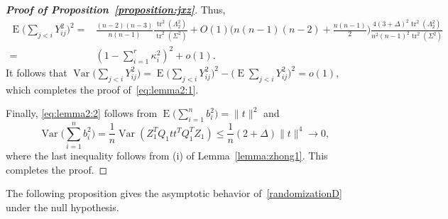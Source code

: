 \documentclass[3p]{elsarticle}
\DeclareMathOperator{\mytr}{tr}
\DeclareMathOperator{\myE}{E}
\DeclareMathOperator{\myVar}{Var}
\theoremstyle{plain}
\theoremstyle{definition}
\theoremstyle{remark}
\begin{document}
\begin{proof}[\textbf{Proof of Proposition~\ref{proposition:jxz}}]
    Thus,
    \begin{equation*}
    \begin{aligned}
        \myE\big(\sum_{j<i}Y_{ij}^2\big)^2
            =& \frac{(n-2)(n-3)}{n(n-1)}\frac{\mytr^2 (\Lambda_2^2)}{\mytr^2(\Sigma^2)}
            +
            O(1)\big(n(n-1)(n-2)+\frac{n(n-1)}{2}\big)\frac{4(3+\Delta)^2\mytr^2(\Lambda_2^2)}{n^2(n-1)^2\mytr^2(\Sigma^2)}\\
            =& (1-\sum_{i=1}^r \kappa_i^2)^2+o(1).
    \end{aligned}
    \end{equation*}
    It follows that
    $
    \myVar\big(\sum_{j<i}Y_{ij}^2\big)=
    \myE\big(\sum_{j<i}Y_{ij}^2\big)^2-
    \big(\myE\sum_{j<i}Y_{ij}^2\big)^2=o(1)
    $, which completes the proof of~\eqref{eq:lemma2:1}.


    Finally, \eqref{eq:lemma2:2} follows from
$
\myE \big(\sum_{i=1}^n b_i^2\big)=\|t\|^2
$
and
$$
\myVar \big(\sum_{i=1}^n b_i^2 \big)=\frac{1}{n}\myVar (Z_1^T Q_1 t t^T Q_1^T Z_1)
\leq \frac{1}{n}(2+\Delta)\|t\|^4\to 0,
$$
where the last inequality follows from (i) of Lemma~\ref{lemma:zhong1}.
This completes the proof.


\end{proof}



The following proposition gives the asymptotic behavior of~\eqref{randomizationD} under the null hypothesis.
\end{document}
